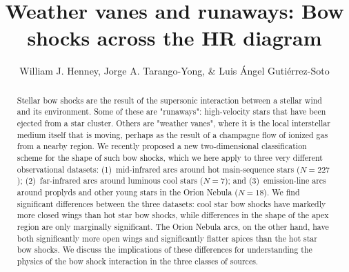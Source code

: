 \documentclass[useAMS, usenatbib, a4paper]{mnras}
\title[Stellar bow shocks]{Weather vanes and runaways: Bow
  shocks across the HR diagram}
\author[Henney \& Tarango Yong]{
  William J. Henney, Jorge A. Tarango-Yong, \& Luis \'Angel Guti\'errez-Soto \\
  \AddressCRyA
}
\newcommand\hii{\ion{H}{ii}}
\begin{document}
\maketitle
\begin{abstract}
  Stellar bow shocks are the result of the supersonic interaction
  between a stellar wind and its environment.  Some of these are
  "runaways": high-velocity stars that have been ejected from a star
  cluster.  Others are "weather vanes", where it is the local
  interstellar medium itself that is moving, perhaps as the result of
  a champagne flow of ionized gas from a nearby \hii{} region.
  We recently proposed a new two-dimensional classification scheme for
  the shape of such bow shocks, which we here apply to three very
  different observational datasets: (1)~mid-infrared arcs
  around hot main-sequence stars (\(N = 227\)); (2)~far-infrared arcs
  around luminous cool stars (\(N = 7\)); and (3)~emission-line arcs
  around proplyds and other young stars in the Orion Nebula
  (\(N = 18\)).  We find significant differences between the three
  datasets: cool star bow shocks have markedly more closed wings than
  hot star bow shocks, while differences in the shape of the apex
  region are only marginally significant.  The Orion Nebula arcs, on
  the other hand, have both significantly more open wings and
  significantly flatter apices than the hot star bow shocks.  We
  discuss the implications of these differences for understanding the
  physics of the bow shock interaction in the three classes of
  sources.
\end{abstract}


\clearpage



\clearpage


\appendix

\end{document}
